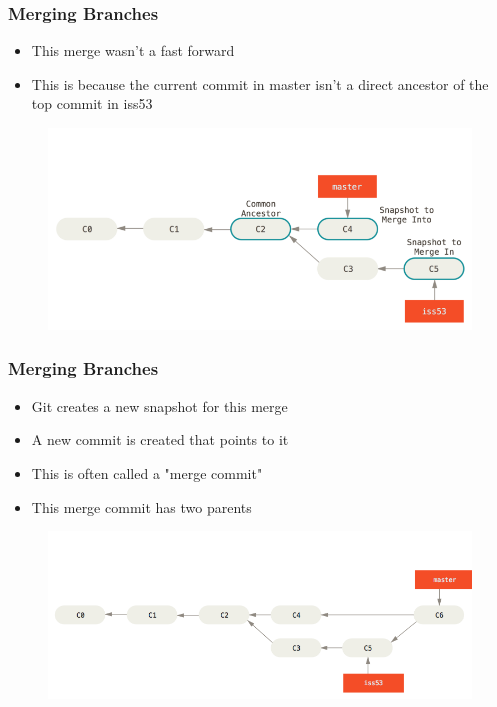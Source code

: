 \documentclass{beamer}
\begin{document}
\begin{frame}
	\frametitle{Merging Branches}
	\begin{itemize}
		\item{This merge wasn't a fast forward}
		\item{This is because the current commit in master isn't a direct ancestor of the top commit in iss53}
	\end{itemize}
	\begin{figure}
		\includegraphics[scale=0.38]{Merging_Branches-7.png}
	\end{figure}
\end{frame}

\begin{frame}
	\frametitle{Merging Branches}
	\begin{itemize}
		\item{Git creates a new snapshot for this merge}
		\item{A new commit is created that points to it}
		\item{This is often called a "merge commit"}
		\item{This merge commit has two parents}
	\end{itemize}
	\begin{figure}
		\includegraphics[scale=0.38]{Merging_Branches-8.png}
	\end{figure}
\end{frame}
\end{document}
